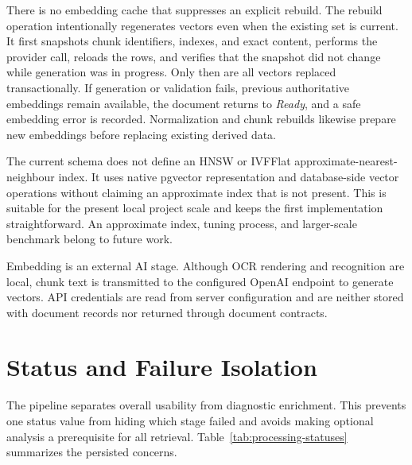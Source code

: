 There is no embedding cache that suppresses an explicit rebuild. The rebuild
operation intentionally regenerates vectors even when the existing set is
current. It first snapshots chunk identifiers, indexes, and exact content,
performs the provider call, reloads the rows, and verifies that the snapshot did
not change while generation was in progress. Only then are all vectors replaced
transactionally. If generation or validation fails, previous authoritative
embeddings remain available, the document returns to \emph{Ready}, and a safe
embedding error is recorded. Normalization and chunk rebuilds likewise prepare
new embeddings before replacing existing derived data.

The current schema does not define an HNSW or IVFFlat approximate-nearest-
neighbour index. It uses native pgvector representation and database-side
vector operations without claiming an approximate index that is not present.
This is suitable for the present local project scale and keeps the first
implementation straightforward. An approximate index, tuning process, and
larger-scale benchmark belong to future work.

Embedding is an external AI stage. Although OCR rendering and recognition are
local, chunk text is transmitted to the configured OpenAI endpoint to generate
vectors. API credentials are read from server configuration and are neither
stored with document records nor returned through document contracts.

\section{Status and Failure Isolation}
\label{sec:ingestion-status-isolation}

The pipeline separates overall usability from diagnostic enrichment. This
prevents one status value from hiding which stage failed and avoids making
optional analysis a prerequisite for all retrieval. Table~\ref{tab:processing-statuses}
summarizes the persisted concerns.

